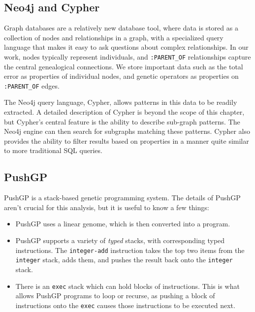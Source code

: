 \subsection{Neo4j and Cypher}
\label{subsec:Neo4j}


Graph databases \citep{Robinson:GraphDB:Book} are a relatively new database tool, where data is stored 
as a collection of nodes and relationships in a graph, with a specialized query language that makes 
it easy to ask questions about complex relationships.
In our work, nodes typically represent individuals, and \texttt{:PARENT\_OF} relationships 
capture the central genealogical connections. We store important data such as the total error as
properties of individual nodes, and genetic operators as properties on 
\texttt{:PARENT\_OF} edges.

The Neo4j query language, Cypher, allows patterns in this data to be readily extracted.
A detailed description of Cypher is beyond the scope of this chapter, but Cypher's central feature is
the ability to describe sub-graph patterns. The Neo4j engine can then search
for subgraphs matching these patterns. Cypher also provides the ability to 
filter results based on properties in a manner quite similar to more traditional SQL queries.

\subsection{PushGP}

PushGP \citep{spector:2002:GPEM, 1068292:new} is a stack-based genetic programming system. The details
of PushGP aren't crucial for this analysis, but it is useful to know a few things:
\begin{itemize}
	\item PushGP uses a linear genome, which is then converted into a program.
	\item PushGP supports a variety of \emph{typed} stacks, with corresponding typed instructions.
	The \texttt{integer-add} instruction takes the top two items from the \texttt{integer}
	stack, adds them, and pushes the result back onto the \texttt{integer} stack.
	\item There is an \texttt{exec} stack which can hold blocks of instructions. This is what allows
	PushGP programs to loop or recurse, as pushing a block of instructions onto the \texttt{exec}
	causes those instructions to be executed next.
\end{itemize}

